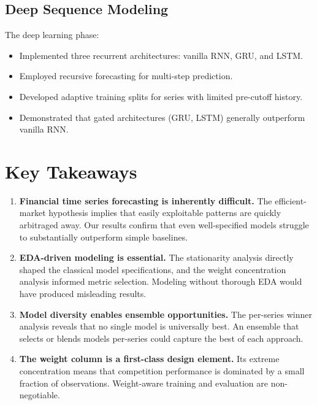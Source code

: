 \subsection{Deep Sequence Modeling}

The deep learning phase:
\begin{itemize}
    \item Implemented three recurrent architectures: vanilla RNN, GRU, and LSTM.
    \item Employed recursive forecasting for multi-step prediction.
    \item Developed adaptive training splits for series with limited pre-cutoff history.
    \item Demonstrated that gated architectures (GRU, LSTM) generally outperform vanilla RNN.
\end{itemize}

\section{Key Takeaways}

\begin{enumerate}
    \item \textbf{Financial time series forecasting is inherently difficult.} The efficient-market hypothesis implies that easily exploitable patterns are quickly arbitraged away. Our results confirm that even well-specified models struggle to substantially outperform simple baselines.

    \item \textbf{EDA-driven modeling is essential.} The stationarity analysis directly shaped the classical model specifications, and the weight concentration analysis informed metric selection. Modeling without thorough EDA would have produced misleading results.

    \item \textbf{Model diversity enables ensemble opportunities.} The per-series winner analysis reveals that no single model is universally best. An ensemble that selects or blends models per-series could capture the best of each approach.

    \item \textbf{The weight column is a first-class design element.} Its extreme concentration means that competition performance is dominated by a small fraction of observations. Weight-aware training and evaluation are non-negotiable.
\end{enumerate}

